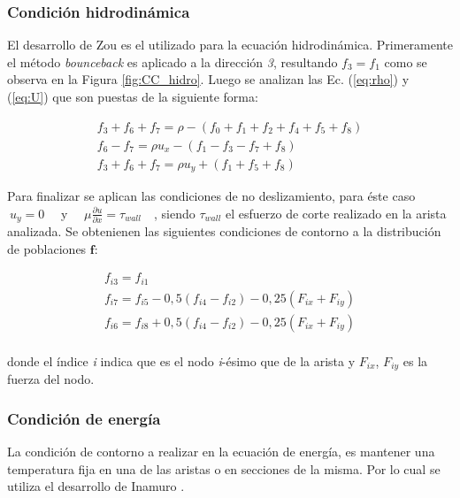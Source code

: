\subsubsection{Condición hidrodinámica}

El desarrollo de Zou \cite{zou1997pressure} es el utilizado para la ecuación hidrodinámica. Primeramente el método \textit{bounceback} es aplicado a la dirección \textit{3}, resultando $f_{3} = f_{1}$ como se observa en la Figura \ref{fig:CC_hidro}. Luego se analizan las Ec. (\ref{eq:rho}) y (\ref{eq:U}) que son puestas de la siguiente forma:

\begin{equation}
	\begin{array}{c}
	f_{3} + f_{6} + f_{7} = \rho - \left( f_{0} + f_{1} + f_{2} + f_{4} + f_{5} + f_{8}	 \right)\\
	f_{6} - f_{7} = \rho u_{x} - \left( f_{1} - f_{3} - f_{7} + f_{8} 	 \right)\\
	f_{3} + f_{6} + f_{7} = \rho u_{y} + \left( f_{1} + f_{5} + f_{8} \right)
	\end{array}
\end{equation}

Para finalizar se aplican las condiciones de no deslizamiento, para éste caso $\> u_{y} = 0\quad$ y $\quad\mu \frac{\partial u}{\partial x} = \tau_{wall}\quad$, siendo $\tau_{wall}$ el esfuerzo de corte realizado en la arista analizada. Se obtenienen las siguientes condiciones de contorno a la distribución de poblaciones $\mathbf{f}$:

\begin{equation}
\begin{array}{c}
f_{i3} = f_{i1}\\
f_{i7} = f_{i5} - 0,5 (f_{i4} - f_{i2}) - 0,25 (F_{ix} + F_{iy})\\
f_{i6} = f_{i8} + 0,5 (f_{i4} - f_{i2}) - 0,25 (F_{ix} + F_{iy})\\
\end{array}
\end{equation}

donde el índice \textit{i} indica que es el nodo \textit{i}-ésimo que de la arista y $F_{ix}$, $F_{iy}$ es la fuerza del nodo. 


\subsubsection{Condición de energía}

La condición de contorno a realizar en la ecuación de energía, es mantener una temperatura fija en una de las aristas o en secciones de la misma. Por lo cual se utiliza el desarrollo de Inamuro \cite{inamuro2002lattice}.


